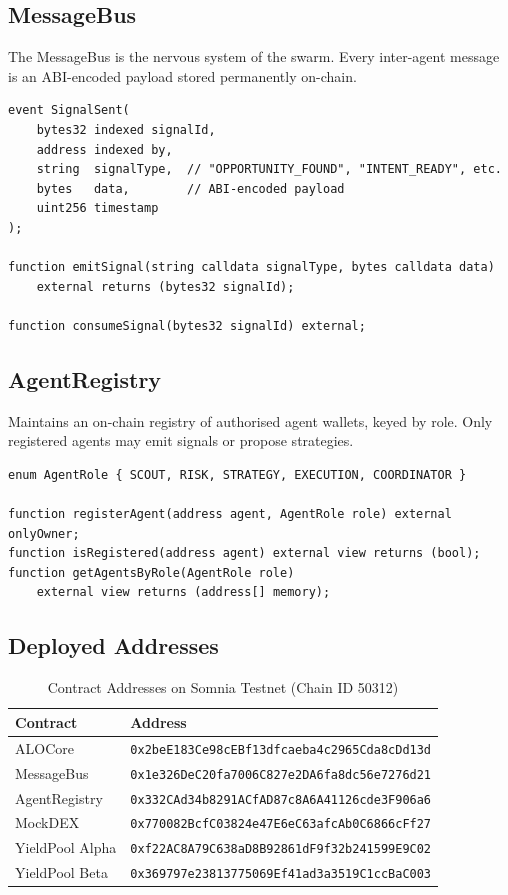 \documentclass[11pt,a4paper]{article}
\begin{document}
\subsection{MessageBus}

The MessageBus is the nervous system of the swarm. Every inter-agent message is an
ABI-encoded payload stored permanently on-chain.

\begin{lstlisting}[caption=MessageBus Signal Interface]
event SignalSent(
    bytes32 indexed signalId,
    address indexed by,
    string  signalType,  // "OPPORTUNITY_FOUND", "INTENT_READY", etc.
    bytes   data,        // ABI-encoded payload
    uint256 timestamp
);

function emitSignal(string calldata signalType, bytes calldata data)
    external returns (bytes32 signalId);

function consumeSignal(bytes32 signalId) external;
\end{lstlisting}

\subsection{AgentRegistry}

Maintains an on-chain registry of authorised agent wallets, keyed by role. Only registered
agents may emit signals or propose strategies.

\begin{lstlisting}[caption=AgentRegistry Role Enforcement]
enum AgentRole { SCOUT, RISK, STRATEGY, EXECUTION, COORDINATOR }

function registerAgent(address agent, AgentRole role) external onlyOwner;
function isRegistered(address agent) external view returns (bool);
function getAgentsByRole(AgentRole role)
    external view returns (address[] memory);
\end{lstlisting}

\subsection{Deployed Addresses}

\begin{table}[H]
\centering
\caption{Contract Addresses on Somnia Testnet (Chain ID 50312)}
\begin{tabular}{@{}ll@{}}
  \toprule
  \textbf{Contract} & \textbf{Address} \\
  \midrule
  ALOCore         & \texttt{0x2beE183Ce98cEBf13dfcaeba4c2965Cda8cDd13d} \\
  MessageBus      & \texttt{0x1e326DeC20fa7006C827e2DA6fa8dc56e7276d21} \\
  AgentRegistry   & \texttt{0x332CAd34b8291ACfAD87c8A6A41126cde3F906a6} \\
  MockDEX         & \texttt{0x770082BcfC03824e47E6eC63afcAb0C6866cFf27} \\
  YieldPool Alpha & \texttt{0xf22AC8A79C638aD8B92861dF9f32b241599E9C02} \\
  YieldPool Beta  & \texttt{0x369797e23813775069Ef41ad3a3519C1ccBaC003} \\
  \bottomrule
\end{tabular}
\end{table}
\end{document}
